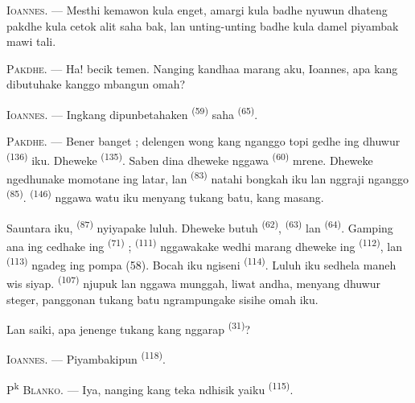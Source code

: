 \textsc{Ioannes}. --- Mesthi kemawon kula enget, amargi kula badhe
nyuwun dhateng pakdhe kula cetok alit saha bak, lan unting-unting badhe
kula damel piyambak mawi tali.

\VUsaut{3.0mm}
\VUsaut{3.0mm}

\textsc{Pakdhe}. --- Ha! becik temen. Nanging kandhaa marang aku,
Ioannes, apa kang dibutuhake kanggo mbangun omah?

\textsc{Ioannes}. --- Ingkang dipunbetahaken 
\textsuperscript{(59)} saha  \textsuperscript{(65)}.

\textsc{Pakdhe}. --- Bener banget ; delengen wong kang nganggo topi
gedhe ing dhuwur  \textsuperscript{(136)} iku. Dheweke
 \textsuperscript{(135)}. Saben dina dheweke
nggawa  \textsuperscript{(60)} mrene. Dheweke
ngedhunake momotane ing latar, lan 
\textsuperscript{(83)} natahi bongkah iku lan nggraji nganggo
 \textsuperscript{(85)}. 
\textsuperscript{(146)} nggawa watu iku menyang tukang batu, kang
masang.

Sauntara iku,  \textsuperscript{(87)}
nyiyapake luluh. Dheweke butuh  \textsuperscript{(62)},
 \textsuperscript{(63)} lan 
\textsuperscript{(64)}. Gamping ana ing cedhake ing 
\textsuperscript{(71)} ; 
\textsuperscript{(111)} nggawakake wedhi marang dheweke ing
 \textsuperscript{(112)}, lan  \textsuperscript{(113)} ngadeg ing pompa (58). Bocah iku ngiseni
 \textsuperscript{(114)}. Luluh iku sedhela maneh wis
siyap.  \textsuperscript{(107)} njupuk lan
nggawa munggah, liwat andha, menyang dhuwur steger, panggonan tukang
batu ngrampungake sisihe omah iku.

Lan saiki, apa jenenge tukang kang nggarap 
\textsuperscript{(31)}?

\textsc{Ioannes}. --- Piyambakipun 
\textsuperscript{(118)}.

\VUsaut{3.0mm}
\VUsaut{3.0mm}

P\textsuperscript{k} \textsc{Blanko}. --- Iya, nanging kang teka
ndhisik yaiku  \textsuperscript{(115)}.


